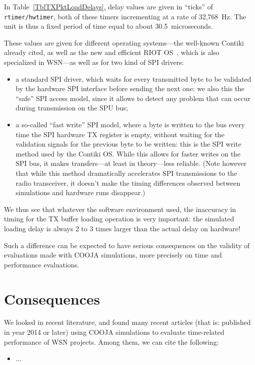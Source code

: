 \documentclass[a4paper,10pt]{article}
\begin{document}
In Table~\ref{TblTXPktLoadDelays}, delay values are given in ``ticks'' of
\texttt{rtimer/hwtimer}, both of these timers incrementing at a rate of
32,768~Hz. The unit is thus a fixed period of time equal to about
30.5~microseconds.

These values are given for different operating systems---the well-known
Contiki already cited, as well as the new and efficient RIOT OS~\cite{RIOT},
which is also specialized in WSN---as well as for two kind of SPI drivers:
\begin{itemize}
\item a standard SPI driver, which waits for every transmitted byte to be
validated by the hardware SPI interface before sending the next one:
we also this the ``safe'' SPI access model, since it allows to detect
any problem that can occur during transmission on the SPU bus;
\item a so-called ``fast write'' SPI model, where a byte is written to
the bus every time the SPI hardware TX register is empty, without waiting
for the validation signals for the previous byte to be written: this is
the SPI write method used by the Contiki OS. While this allows for faster
writes on the SPI bus, it makes transfers---at least in theory---less
reliable. (Note however that while this method dramatically accelerates
SPI transmissions to the radio transceiver, it doesn't make the timing
differences observed between simulations and hardware runs disappear.)
\end{itemize}

We thus see that whatever the software environment used, the inaccuracy
in timing for the TX buffer loading operation is very important:
the simulated loading delay is always 2 to 3 times larger than
the actual delay on hardware!

Such a difference can be expected to have serious consequences on
the validity of evaluations made with COOJA simulations, more precisely
on time and performance evaluations.


\section{Consequences}

We looked in recent literature, and found many recent articles (that is:
published in year 2014 or later) using COOJA simulations to evaluate
time-related performance of WSN projects. Among them, we can cite
the following:
\begin{itemize}
\item ...
\end{itemize}
\end{document}
